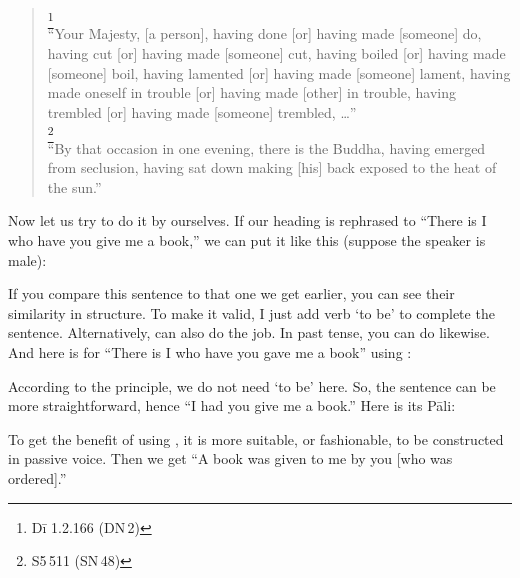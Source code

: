 \begin{quote}
\footnote{D\=i 1.2.166 (DN\,2)}\\
``Your Majesty, [a person], having done [or] having made [someone] do, having cut [or] having made [someone] cut, having boiled [or] having made [someone] boil, having lamented [or] having made [someone] lament, having made oneself in trouble [or] having made [other] in trouble, having trembled [or] having made [someone] trembled, \ldots''\\[1.5mm]
\footnote{S5\,511 (SN\,48)}\\
``By that occasion in one evening, there is the Buddha, having emerged from seclusion, having sat down making [his] back exposed to the heat of the sun.''\\[1.5mm]
\end{quote}

Now let us try to do it by ourselves. If our heading is rephrased to ``There is I who have you give me a book,'' we can put it like this (suppose the speaker is male):


If you compare this sentence to that one we get earlier, you can see their similarity in structure. To make it valid, I just add verb `to be' to complete the sentence. Alternatively,  can also do the job. In past tense, you can do likewise. And here is for ``There is I who have you gave me a book'' using :


According to the principle, we do not need `to be' here. So, the sentence can be more straightforward, hence ``I had you give me a book.'' Here is its P\=ali:


To get the benefit of using , it is more suitable, or fashionable, to be constructed in passive voice. Then we get ``A book was given to me by you [who was ordered].''


